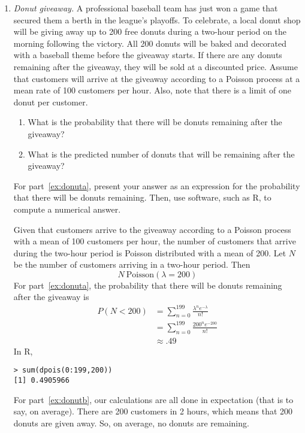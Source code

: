 \begin{enumerate}
\item \emph{Donut giveaway.}  A professional baseball team has just
  won a game that secured them a berth in the league’s playoffs. To
  celebrate, a local donut shop will be giving away up to 200 free
  donuts during a two-hour period on the morning following the
  victory. All 200 donuts will be baked and decorated with a baseball
  theme before the giveaway starts. If there are any donuts remaining
  after the giveaway, they will be sold at a discounted price. Assume
  that customers will arrive at the giveaway according to a Poisson
  process at a mean rate of 100 customers per hour. Also, note that
  there is a limit of one donut per customer.
\begin{enumerate}
\item What is the probability that there will be donuts remaining after the giveaway? \label{ex:donuta}
\item What is the predicted number of donuts that will be remaining after the giveaway? \label{ex:donutb}
\end{enumerate}

For part~\ref{ex:donuta}, present your answer as an expression for the
probability that there will be donuts remaining. Then, use software,
such as R, to compute a numerical answer.

\begin{solution}
  \bs Given that customers arrive to the giveaway according to a
  Poisson process with a mean of 100 customers per hour, the number of
  customers that arrive during the two-hour period is Poisson
  distributed with a mean of 200. Let $N$ be the number of customers
  arriving in a two-hour period. Then
\[ N ~ \text{Poisson}(\lambda = 200) \]
For part~\ref{ex:donuta}, the probability that there will be donuts remaining after the giveaway is 
\begin{align*}
      P(N < 200) &= \sum_{n=0}^{199} \frac{\lambda^n e^{-\lambda}}{n!}\\
      &= \sum_{n=0}^{199} \frac{200^n e^{-200}}{n!}\\
      &\approx .49
\end{align*}
In R,
\begin{Verbatim}
> sum(dpois(0:199,200))
[1] 0.4905966
\end{Verbatim}  

For part~\ref{ex:donutb}, our calculations are all done in expectation
(that is to say, on average). There are 200 customers in 2 hours,
which means that 200 donuts are given away. So, on average, no donuts
are remaining.
\end{solution}


\end{enumerate}
